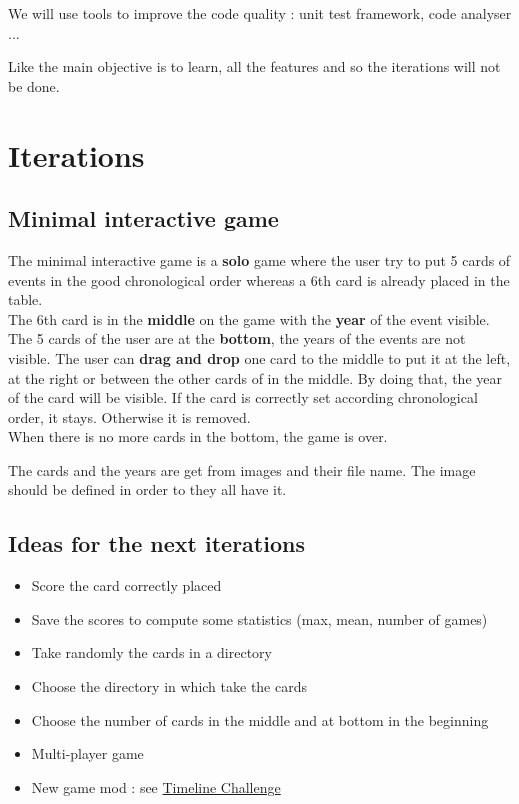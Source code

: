 \documentclass[12pt,a4paper,twoside]{article}
\begin{document}
\vspace{5mm}

We will use tools to improve the code quality : unit test framework, code analyser ...

\vspace{5mm}

Like the main objective is to learn, all the features and so the iterations will not be done.

\newpage

\section{Iterations}

\subsection{Minimal interactive game}

The minimal interactive game is a \textbf{solo} game where the user try to put 5 cards of events in the good chronological order whereas a 6th card is already placed in the table.\\
The 6th card is in the \textbf{middle} on the game with the \textbf{year} of the event visible.\\
The 5 cards of the user are at the \textbf{bottom}, the years of the events are not visible. The user can \textbf{drag and drop} one card to the middle to put it at the left, at the right or between the other cards of in the middle. By doing that, the year of the card will be visible. If the card is correctly set according chronological order, it stays. Otherwise it is removed.\\
When there is no more cards in the bottom, the game is over.

The cards and the years are get from images and their file name.
The image should be defined in order to they all have it.

\subsection{Ideas for the next iterations}
\begin{itemize}
\item Score the card correctly placed
\item Save the scores to compute some statistics (max, mean, number of games)
\item Take randomly the cards in a directory
\item Choose the directory in which take the cards
\item Choose the number of cards in the middle and at bottom in the beginning
\item Multi-player game
\item New game mod : see \href{https://www.trictrac.net/actus/timeline-challenge-le-comment-ca-marche}{Timeline Challenge}
\end{itemize}
\end{document}
